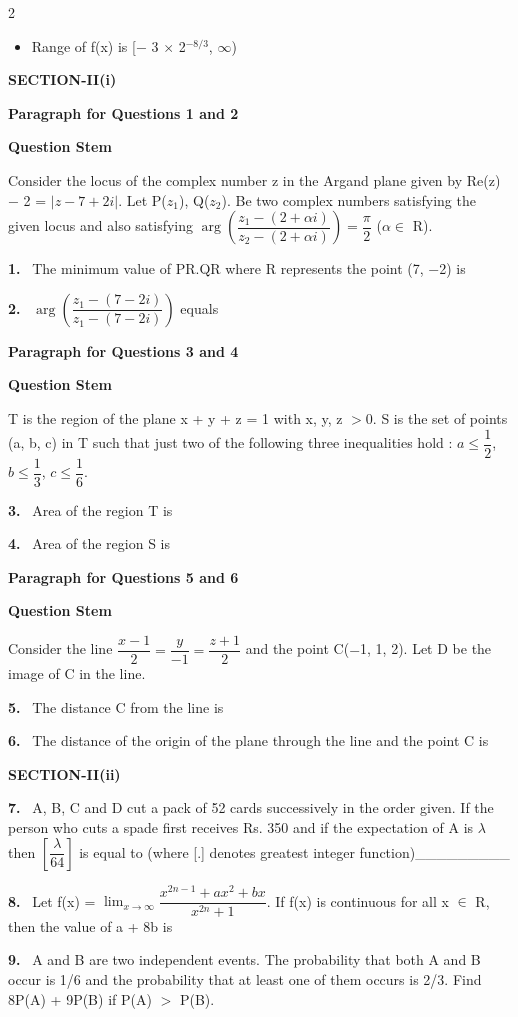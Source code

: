\documentclass[10pt]{extarticle}
\newcommand{\sect}[1]{\par\smallskip\noindent\textbf{#1}\par}
\newcommand{\qn}[1]{\par\smallskip\noindent\textbf{#1.}~}
\newcommand{\paraq}[2]{\par\smallskip\noindent\textbf{Paragraph for Questions #1 and #2}\par}
\newenvironment{qoptions}{\begin{itemize}[leftmargin=1.8em,itemsep=1pt,topsep=2pt,label={}]}{\end{itemize}}
\newcommand{\opt}[2]{\item[(#1)] #2}
\begin{document}
\begin{multicols}{2}
\begin{qoptions}
\opt{D}{Range of f(x) is [$-$ 3 $\times$ 2$^{-8/3}$, $\infty$)}
\end{qoptions}
\sect{SECTION-II(i)}
\paraq{1}{2}
\textbf{Question Stem}\par
Consider the locus of the complex number z in the Argand plane given by Re(z) $-$ 2 = $|z-7+2i|$. Let P($z_1$), Q($z_2$). Be two complex numbers satisfying the given locus and also satisfying $\arg\left(\dfrac{z_1-(2+\alpha i)}{z_2-(2+\alpha i)}\right)=\dfrac\pi2$ ($\alpha\in$ R).
\qn{1} The minimum value of PR.QR where R represents the point (7, $-$2) is
\qn{2} $\arg\left(\dfrac{z_1-(7-2i)}{z_1-(7-2i)}\right)$ equals
\paraq{3}{4}
\textbf{Question Stem}\par
T is the region of the plane x + y + z = 1 with x, y, z $>$0. S is the set of points (a, b, c) in T such that just two of the following three inequalities hold : $a\leqslant\dfrac12$, $b\leqslant\dfrac13$, $c\leqslant\dfrac16$.
\qn{3} Area of the region T is
\qn{4} Area of the region S is
\paraq{5}{6}
\textbf{Question Stem}\par
Consider the line $\dfrac{x-1}2=\dfrac y{-1}=\dfrac{z+1}2$ and the point C($-$1, 1, 2). Let D be the image of C in the line.
\qn{5} The distance C from the line is
\qn{6} The distance of the origin of the plane through the line and the point C is
\sect{SECTION-II(ii)}
\qn{7} A, B, C and D cut a pack of 52 cards successively in the order given. If the person who cuts a spade first receives Rs. 350 and if the expectation of A is $\lambda$ then $\left[\dfrac\lambda{64}\right]$ is equal to (where [.] denotes greatest integer function)\_\_\_\_\_\_\_\_\_
\qn{8} Let f(x) = $\displaystyle\lim_{x\to\infty}\dfrac{x^{2n-1}+ax^2+bx}{x^{2n}+1}$. If f(x) is continuous for all x $\in$ R, then the value of a + 8b is
\qn{9} A and B are two independent events. The probability that both A and B occur is 1/6 and the probability that at least one of them occurs is 2/3. Find 8P(A) + 9P(B) if P(A) $>$ P(B).
\end{multicols}
\end{document}
